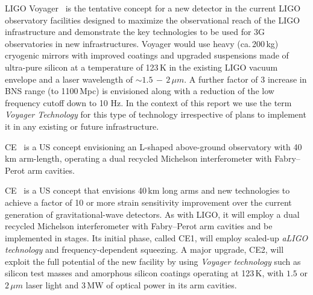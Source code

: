 \begin{tcolorbox}[standard jigsaw,colframe=azure!70!black,colback=azure!20!white,opacityback=0.6,coltext=black, title= LIGO Voyager]
LIGO Voyager~\cite{Voyager:Inst,VoyagerDCC2018} is the tentative concept for a new detector in the current LIGO observatory facilities designed to maximize the observational reach of the LIGO infrastructure and demonstrate the key technologies to be used for 3G observatories in new infrastructures.
Voyager would use heavy (ca.\,200\,kg) cryogenic mirrors with improved coatings and upgraded suspensions made of ultra-pure silicon at a temperature of 123\,K in the existing LIGO vacuum envelope and a laser wavelength of $\sim1.5\,-\,2\,\mu m$. 
A further factor of 3 increase in BNS range (to 1100\,Mpc) is envisioned along with a reduction of the low frequency cutoff down to 10 Hz. In the context of this report we use the term \emph{Voyager Technology} for this type of technology irrespective of plans to implement it in any existing or future infrastructure.
\end{tcolorbox}

\begin{tcolorbox}[standard jigsaw,colframe=antiquefuchsia!80!black,colback=antiquefuchsia!20!white,opacityback=0.6,coltext=black, title=Cosmic Explorer (CE)] 
CE~\cite{CosmicExplorer2017} is a US concept envisioning an L-shaped above-ground observatory with 40\,km arm-length, operating a dual recycled Michelson interferometer with Fabry--Perot arm cavities. 

CE~\cite{CosmicExplorer2017} is a US concept that envisions 40\,km long arms and new technologies to achieve a factor of 10 or more strain sensitivity improvement over the current generation of gravitational-wave detectors. As with LIGO, it will employ a dual recycled Michelson interferometer with Fabry--Perot arm cavities and be implemented in stages. Its initial phase, called CE1, will employ scaled-up \emph{aLIGO technology} and frequency-dependent squeezing. 
A major upgrade, CE2, will exploit the full potential of the new facility by using \emph{Voyager technology} such as silicon test masses and amorphous silicon coatings operating at 123\,K, with $1.5$ or $2\,\mu m$ laser light and 3\,MW of optical power in its arm cavities.
\end{tcolorbox}

